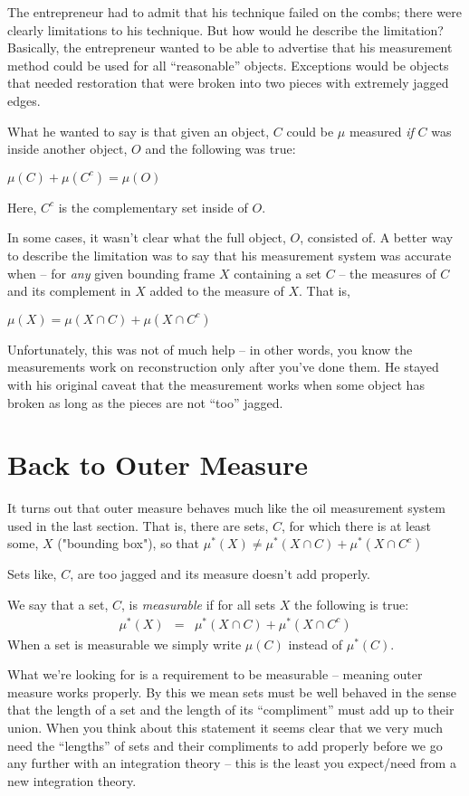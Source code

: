\documentclass{article}
\begin{document}
The entrepreneur had to admit that his technique failed on the combs; 
there were clearly limitations to his technique. 
But how would he describe the limitation? Basically, the entrepreneur wanted to 
be able to advertise that his measurement method could be used for all 
``reasonable'' objects. Exceptions would be objects that needed restoration 
that were broken into two pieces with extremely jagged edges.

What he wanted to say is that given an object, $C$ could be $\mu$ measured 
{\em if\/} $C$ was inside another object, $O$ and the following was true:

$\mu(C) + \mu(C^c) = \mu(O)$

Here, $C^c$ is the complementary set inside of $O$.

In some cases, it wasn't clear what the full object, $O$, consisted of. A better way 
to describe the limitation was to say that his measurement system was accurate 
when -- for {\em any\/} given bounding frame $X$ containing a set $C$ -- 
the measures of $C$ and 
its complement in $X$ added to the measure of $X$. That is,

$\mu(X) = \mu(X \cap C) + \mu(X \cap C^c)$

Unfortunately, this was not of much help -- in other words, you know the 
measurements work on reconstruction only after you've done them.
He stayed with his original caveat that the measurement works when some object has 
broken as long as the pieces are not ``too'' jagged.


\section{Back to Outer Measure}
It turns out that outer measure behaves much like the oil measurement system 
used in the last section. That is, there are sets, $C$, for which there is at 
least some, $X$ ("bounding box"), so that
$\mu^*(X) \neq \mu^*(X \cap C) + \mu^*(X \cap C^c)$

Sets like, $C$, are too jagged and its measure doesn't add properly.

We say that a set, $C$, is {\em measurable\/}
if for all sets $X$ the following is true:
\begin{eqnarray}
	\mu^*(X) & = & \mu^*(X \cap C) + \mu^*(X \cap C^c) \label{Carthy}
\end{eqnarray}
When a set is measurable we simply write $\mu(C)$ instead of $\mu^*(C)$.

What we're looking for is a requirement to be measurable -- meaning
outer measure works properly. By this we mean sets must be well behaved
in the sense that the length of a set and the length of its ``compliment'' 
must add up to their union. When you think about this statement it
seems clear that we very much need the ``lengths'' of sets and their compliments
to add properly before we go any further with an integration theory -- this 
is the least you expect/need from a new integration theory.
\end{document}
